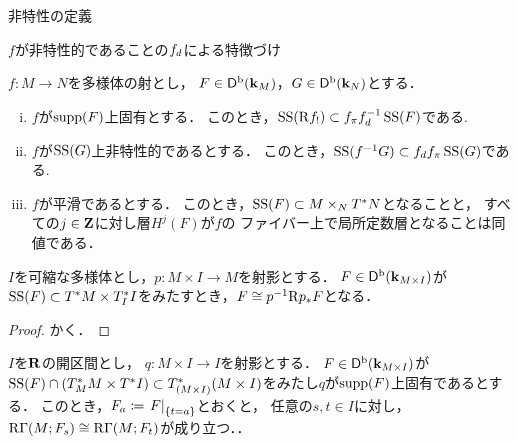 \begin{DFN}\label{def14}
    非特性の定義
\end{DFN}

\(f\)が非特性的であることの\(\mdiff[f]\)による特徴づけ

\begin{THM}[{\cite[5.4節]{KS90}}参照]\label{thm15}
    \(f\colon M\to N\)を多様体の射とし，
    \(F\in\Dompb(\kk_M)\)，\(G\in\Dompb(\kk_N)\)とする．
    \begin{enumerate}[(i)]
        \item \(f\)が\(\supp(F)\)上固有とする．
        このとき，\(
            \muS(\Rder{f_{!}})
            \subset
            \mpb[f]\mdiff[f]^{-1}\muS(F)
        \)である.\label{item15-1}
        \item \(f\)が\(\muS(G)\)上非特性的であるとする．
        このとき，\(
            \muS(f^{-1}G)\subset\mdiff[f]\mpb[f]\muS(G)
        \)である.\label{item15-2}
        \item \(f\)が平滑であるとする．
        このとき，\(
            \muS(F)\subset M\mathbin{\times_{N}} \cotb[N]
        \)となることと，
        すべての\(j\in\zz\)に対し層\(H^j(F)\)が\(f\)の
        ファイバー上で局所定数層となることは同値である．\label{item15-3}
    \end{enumerate}
\end{THM}
\begin{CRL}\label{cor16}
    \(I\)を可縮な多様体とし，\(p\colon M\times I\to M\)を射影とする．
    \(F\in\Dompb(\kk_{M\times I})\)が\(
        \muS(F)\subset\cotb[M]\times\cotz[I]
    \)をみたすとき，\(F\cong p^{-1}\Rder{p_{\ast}}F\)となる．
\end{CRL}
\begin{proof}
    かく．
\end{proof}
\begin{CRL}\label{cor17}
    \(I\)を\(\rr\)の開区間とし，
    \(q\colon M\times I\to I\)を射影とする．
    \(F\in\Dompb(\kk_{M\times I})\)が\(
        \muS(F)\cap (\cotz[M]\times\cotb[I])
        \subset
        \cotz[(M\times I)]
    \)をみたし\(q\)が\(\supp(F)\)上固有であるとする．
    このとき，\(F_a\coloneqq \mres[F]{\{t=a\}}\)とおくと，
    任意の\(s,t\in I\)に対し，\(
        \RG(M;F_s)\cong \RG(M;F_t)
    \)が成り立つ．．
\end{CRL}
